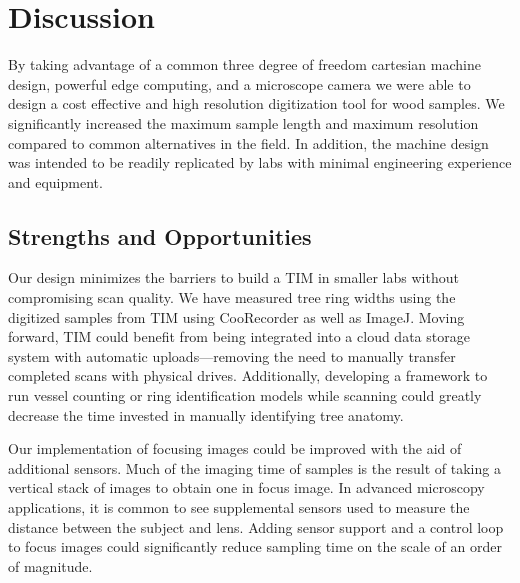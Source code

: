 \documentclass[a4paper,12pt]{article}
\begin{document}
\section{Discussion} %
By taking advantage of a common three degree of freedom cartesian machine design, powerful edge computing, and a microscope camera we were able to design a cost effective and high resolution digitization tool for wood samples. 
We significantly increased the maximum sample length and maximum resolution compared to common alternatives in the field. 
In addition, the machine design was intended to be readily replicated by labs with minimal engineering experience and equipment. 

\subsection{Strengths and Opportunities}
Our design minimizes the barriers to build a TIM in smaller labs without compromising scan quality. We have measured tree ring widths using the digitized samples from TIM using CooRecorder as well as ImageJ.
Moving forward, TIM could benefit from being integrated into a cloud data storage system with automatic uploads---removing the need to manually transfer completed scans with physical drives.
Additionally, developing a framework to run vessel counting or ring identification models while scanning could greatly decrease the time invested in manually identifying tree anatomy. %

Our implementation of focusing images could be improved with the aid of additional sensors. Much of the imaging time of samples is the result of taking a vertical stack of images to obtain one in focus image. In advanced microscopy applications, it is common to see supplemental sensors used to measure the distance between the subject and lens.
Adding sensor support and a control loop to focus images could significantly reduce sampling time on the scale of an order of magnitude. 



\end{document}
